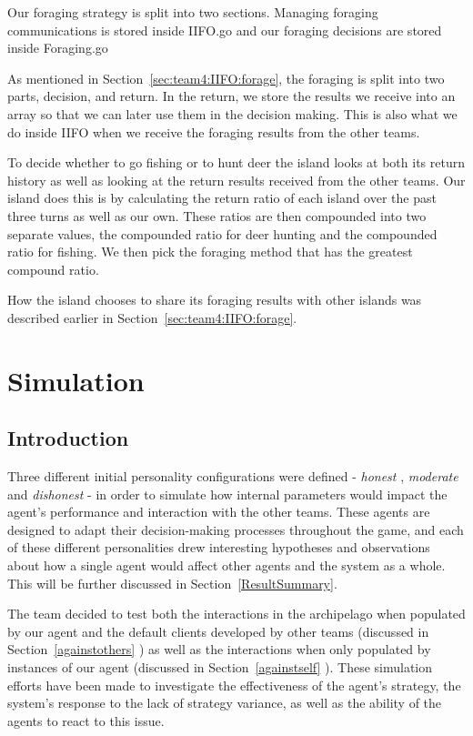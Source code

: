 Our foraging strategy is split into two sections. Managing foraging communications is stored inside IIFO.go and our foraging decisions are stored inside Foraging.go

As mentioned in Section~\ref{sec:team4:IIFO:forage}, 
the foraging is split into two parts, decision, and return. In the return, we store the results we receive into an array so that we can later use them in the decision making. This is also what we do inside IIFO when we receive the foraging results from the other teams. 

To decide whether to go fishing or to hunt deer the island looks at both its return history as well as looking at the return results received from the other teams. Our island does this is by calculating the return ratio of each island over the past three turns as well as our own. These ratios are then compounded into two separate values, the compounded ratio for deer hunting and the compounded ratio for fishing.  We then pick the foraging method that has the greatest compound ratio. 

How the island chooses to share its foraging results with other islands was described earlier in Section~\ref{sec:team4:IIFO:forage}. 


\section{Simulation}    \label{sec:team4:simulation}



\subsection{Introduction}
Three different initial personality configurations were defined -
\emph{honest} , \emph{moderate} and \emph{dishonest} - in order to simulate how internal parameters would impact the agent's performance and interaction with the other teams.
These agents are designed to adapt their decision-making processes throughout the game, and each of these different personalities drew interesting hypotheses and observations about how a single agent would affect other agents and the system as a whole. This will be further discussed in Section~\ref{ResultSummary}. 

The team decided to test both the interactions in the archipelago when populated by our agent and the default clients developed by other teams (discussed in Section~\ref{againstothers} ) as well as the interactions when only populated by instances of our agent (discussed in Section~\ref{againstself} ). These simulation efforts have been made to investigate the effectiveness of the agent's strategy, the system's response to the lack of strategy variance, as well as the ability of the agents to react to this issue.

